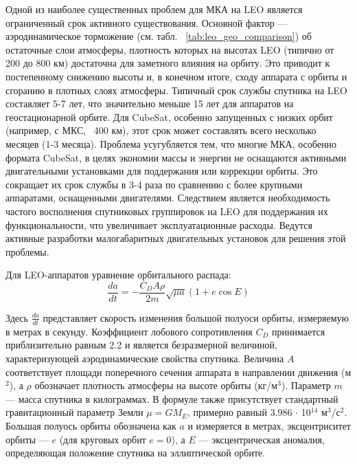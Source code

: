 Одной из наиболее существенных проблем для МКА на LEO является ограниченный срок активного существования. Основной фактор — аэродинамическое торможение (см. табл. ~\ref{tab:leo_geo_comparison}) об остаточные слои атмосферы, плотность которых на высотах LEO (типично от 200 до 800 км) достаточна для заметного влияния на орбиту\cite{leo_lifespan_smith_2021}. Это приводит к постепенному снижению высоты и, в конечном итоге, сходу аппарата с орбиты и сгоранию в плотных слоях атмосферы. Типичный срок службы спутника на LEO составляет 5-7 лет, что значительно меньше 15 лет для аппаратов на геостационарной орбите\cite{leo_lifespan_smith_2021}. Для CubeSat, особенно запущенных с низких орбит (например, с МКС, ~400 км), этот срок может составлять всего несколько месяцев (1-3 месяца)\cite{cubesat_low_orbit_nasa_2020}. Проблема усугубляется тем, что многие МКА, особенно формата CubeSat, в целях экономии массы и энергии не оснащаются активными двигательными установками для поддержания или коррекции орбиты\cite{cubesat_standard_2014}. Это сокращает их срок службы в 3-4 раза по сравнению с более крупными аппаратами, оснащенными двигателями\cite{cubesat_standard_2014}. Следствием является необходимость частого восполнения спутниковых группировок на LEO для поддержания их функциональности, что увеличивает эксплуатационные расходы\cite{leo_lifespan_smith_2021}. Ведутся активные разработки малогабаритных двигательных установок для решения этой проблемы\cite{cubesat_standard_2014}.

Для LEO-аппаратов уравнение орбитального распада:
\begin{equation}
	\frac{da}{dt} = -\frac{C_D A \rho}{2m} \sqrt{\mu a}(1 + e\cos E)
\end{equation}

Здесь $\frac{da}{dt}$ представляет скорость изменения большой полуоси орбиты, измеряемую в метрах в секунду. Коэффициент лобового сопротивления $C_D$ принимается приблизительно равным 2.2 и является безразмерной величиной, характеризующей аэродинамические свойства спутника. Величина $A$ соответствует площади поперечного сечения аппарата в направлении движения (м$^2$), а $\rho$ обозначает плотность атмосферы на высоте орбиты (кг/м$^3$). Параметр $m$ — масса спутника в килограммах. В формуле также присутствует стандартный гравитационный параметр Земли $\mu = GM_E$, примерно равный 3.986 $\cdot$ 10$^{14}$ м$^3$/с$^2$. Большая полуось орбиты обозначена как $a$ и измеряется в метрах, эксцентриситет орбиты — $e$ (для круговых орбит $e = 0$), а $E$ — эксцентрическая аномалия, определяющая положение спутника на эллиптической орбите.

